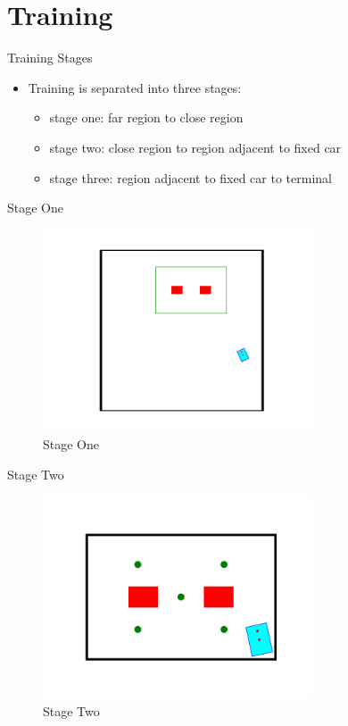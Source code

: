 \documentclass{beamer}
\begin{document}
\section{Training}

\begin{frame}{Training Stages}
\begin{itemize}
\item{Training is separated into three stages:}
\begin{itemize}
\item{stage one: far region to close region}
\item{stage two: close region to region adjacent to fixed car}
\item{stage three: region adjacent to fixed car to terminal}
\end{itemize}
\end{itemize}
\end{frame}

\begin{frame}{Stage One}
	\begin{figure}
		\centering
		\includegraphics[width=8cm]{stage_one_sim.png}
		\caption{Stage One}
		\label{fig:Stage One}
	\end{figure}
\end{frame}

\begin{frame}{Stage Two}
	\begin{figure}
		\centering
		\includegraphics[width=8cm]{stage_two_sim.png}
		\caption{Stage Two}
		\label{fig:Stage Two}
	\end{figure}
\end{frame}
\end{document}
